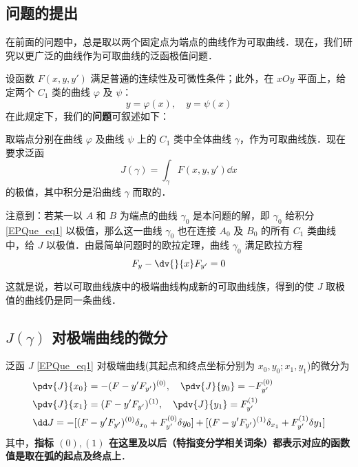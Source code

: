 

\subsection{问题的提出}在前面的问题中，总是取以两个固定点为端点的曲线作为可取曲线．现在，我们研究以更广泛的曲线作为可取曲线的泛函极值问题．

设函数 $F(x,y,y')$ 满足普通的连续性及可微性条件；此外，在 $xOy$ 平面上，给定两个 $C_1$ 类的曲线 $\varphi$ 及 $\psi$：
\begin{equation}
y=\varphi(x),\quad y=\psi(x)
\end{equation}
在此规定下，我们的\textbf{问题}可叙述如下：

取端点分别在曲线 $\varphi$ 及曲线 $\psi$ 上的 $C_1$ 类中全体曲线 $\gamma$，作为可取曲线族．现在要求泛函
\begin{equation}\label{EPQue_eq1}
J(\gamma)=\int_\gamma F(x,y,y')\dd x
\end{equation}
的极值，其中积分是沿曲线 $\gamma$ 而取的．

注意到：若某一以 $A$ 和 $B$ 为端点的曲线 $\gamma_0$ 是本问题的解，即 $\gamma_0$ 给积分\autoref{EPQue_eq1} 以极值，那么这一曲线 $\gamma_0$ 也在连接 $A_0$ 及 $B_0$ 的所有 $C_1$ 类曲线中，给 $J$ 以极值．由最简单问题时的欧拉定理，曲线 $\gamma_0$ 满足欧拉方程
\begin{equation}
F_y-\dv{}{x}F_{y'}=0
\end{equation}

这就是说，若以可取曲线族中的极端曲线构成新的可取曲线族，得到的使 $J$ 取极值的曲线仍是同一条曲线．
\subsection{$J(\gamma)$ 对极端曲线的微分} 
\begin{theorem}{}
泛函 $J$ \autoref{EPQue_eq1} 对极端曲线(其起点和终点坐标分别为 $x_0,y_0;x_1,y_1$)的微分为
\begin{equation}\label{EPQue_eq5}
\begin{aligned}
&\pdv{J}{x_0}=-(F-y'F_{y'})^{(0)},\quad \pdv{J}{y_0}=-F_{y'}^{(0)}\\
&\pdv{J}{x_1}=(F-y'F_{y'})^{(1)},\quad \pdv{J}{y_1}=F_{y'}^{(1)}\\
&\dd J=-[(F-y'F_{y'})^{(0)}\delta_{x_0}+ F_{y'}^{(0)}\delta y_0]+[(F-y'F_{y'})^{(1)}\delta_{x_1}+F_{y'}^{(1)}\delta y_1]
\end{aligned}
\end{equation}
其中，\textbf{指标 ${(0)},{(1)}$ 在这里及以后（特指变分学相关词条）都表示对应的函数值是取在弧的起点及终点上}．
\end{theorem}
